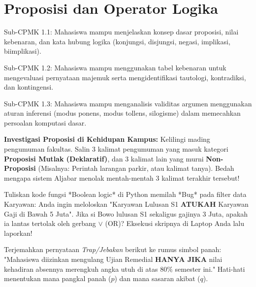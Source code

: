 \documentclass[../main]{subfiles}
\begin{document}
\chapter{Proposisi dan Operator Logika}

\begin{subcpmk}
  \item Sub-CPMK 1.1: Mahasiswa mampu menjelaskan konsep dasar proposisi, nilai kebenaran, dan kata hubung logika (konjungsi, disjungsi, negasi, implikasi, biimplikasi).
  \item Sub-CPMK 1.2: Mahasiswa mampu menggunakan tabel kebenaran untuk mengevaluasi pernyataan majemuk serta mengidentifikasi tautologi, kontradiksi, dan kontingensi.
  \item Sub-CPMK 1.3: Mahasiswa mampu menganalisis validitas argumen menggunakan aturan inferensi (modus ponens, modus tollens, silogisme) dalam memecahkan persoalan komputasi dasar.
\end{subcpmk}









\begin{aktivitas}
  \item \textbf{Investigasi Proposisi di Kehidupan Kampus:} Kelilingi mading pengumuman fakultas. Salin 3 kalimat pengumuman yang masuk kategori \textbf{Proposisi Mutlak (Deklaratif)}, dan 3 kalimat lain yang murni \textbf{Non-Proposisi} (Misalnya: Perintah larangan parkir, atau kalimat tanya). Bedah mengapa sistem Aljabar menolak mentah-mentah 3 kalimat terakhir tersebut!
  \item Tuliskan kode fungsi *Boolean logic* di Python memilah *Bug* pada filter data Karyawan: Anda ingin meloloskan "Karyawan Lulusan S1 \textbf{ATUKAH} Karyawan Gaji di Bawah 5 Juta". Jika si Bowo lulusan S1 sekaligus gajinya 3 Juta, apakah ia lantas tertolak oleh gerbang $\lor$ (OR)? Eksekusi skripnya di Laptop Anda lalu laporkan!
  \item Terjemahkan pernyataan \textit{Trap/Jebakan} berikut ke rumus simbol panah: "Mahasiswa diizinkan mengulang Ujian Remedial \textbf{HANYA JIKA} nilai kehadiran absennya merengkuh angka utuh di atas 80\% semester ini." Hati-hati menentukan mana pangkal panah ($p$) dan mana sasaran akibat ($q$).
\end{aktivitas}
\end{document}
